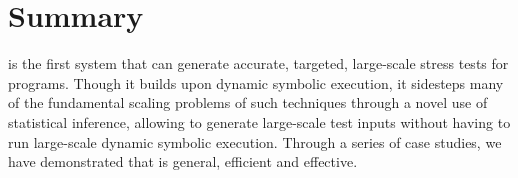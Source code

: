 \section{Summary}\label{sec:conclusion}

\lancet is the first system that can generate accurate, targeted, large-scale stress tests for programs. Though it builds upon dynamic symbolic execution, it sidesteps many of the fundamental scaling problems of such techniques through a novel use of statistical inference, allowing \lancet to generate large-scale test inputs without having to run large-scale dynamic symbolic execution. Through a series of case studies, we have demonstrated that \lancet is general, efficient and effective.
